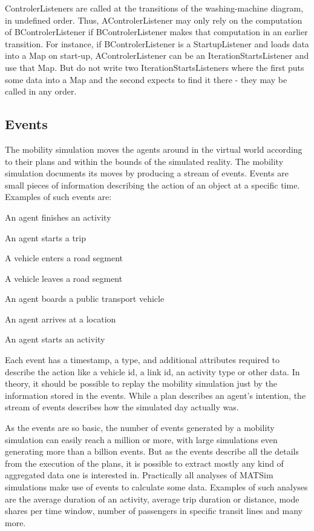 ControlerListeners are called at the transitions of the washing-machine diagram, in undefined order.
Thus, AControlerListener may only rely on the computation of BControlerListener if BControlerListener
 makes that computation in an earlier transition. For instance, if BControlerListener is a StartupListener
 and loads data into a Map on start-up, AControlerListener can be an IterationStartsListener and use that Map.
 But do not write two IterationStartsListeners where the first puts some data into a Map and the second expects
 to find it there - they may be called in any order.

\subsection{Events}
\label{sec:events-extension-point}
The mobility simulation moves the agents around in the virtual world according to their plans and within the bounds of the simulated reality. The mobility simulation documents its moves by producing a stream of events. Events are small pieces of information describing the action of an object at a specific time. Examples of such events are:
\begin{compactitem}
\item    An agent finishes an activity
\item     An agent starts a trip
\item    A vehicle enters a road segment
\item     A vehicle leaves a road segment
\item     An agent boards a public transport vehicle
\item     An agent arrives at a location
\item     An agent starts an activity
\end{compactitem}

Each event has a timestamp, a type, and additional attributes required to describe the action like a vehicle id, a link id, an activity type or other data. In theory, it should be possible to replay the mobility simulation just by the information stored in the events. While a plan 
describes an agent's intention, the stream of events describes how the simulated day actually was.

As the events are so basic, the number of events generated by a mobility simulation can easily reach a million or more, with large simulations even generating more than a billion events. But as the events describe all the details from the execution of the plans, it is possible to extract mostly any kind of aggregated data one is interested in. Practically all analyses of MATSim simulations make use of events to calculate some data. Examples of such analyses are the average duration of an activity, average trip duration or distance, mode shares per time window, number of passengers in specific transit lines and many more.

